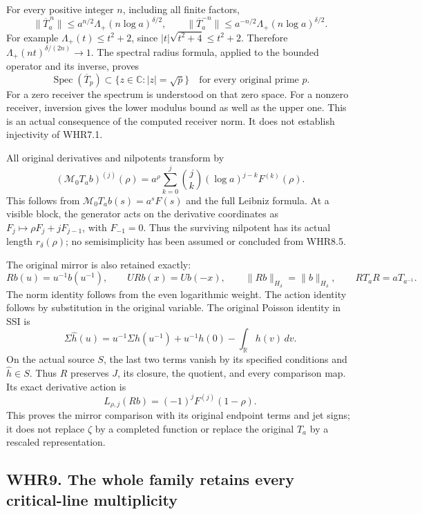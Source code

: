 For every positive integer \(n\), including all finite factors, \[
 \|\overline T_a^{\,n}\|
 \leq a^{n/2}\Lambda_+(n\log a)^{\delta/2},
 \qquad
 \|\overline T_a^{-n}\|
 \leq a^{-n/2}\Lambda_+(n\log a)^{\delta/2}.
 \tag{WHR8.4}
\] For example \(\Lambda_+(t)\leq t^2+2\), since
\(|t|\sqrt{t^2+4}\leq t^2+2\). Therefore
\(\Lambda_+(nt)^{\delta/(2n)}\to1\). The spectral radius formula,
applied to the bounded operator and its inverse, proves \[
 \boxed{\operatorname{Spec}(\overline T_p)
               \subset\{z\in\mathbb C:|z|=\sqrt p\}}
 \quad\text{for every original prime }p.
 \tag{WHR8.5}
\] For a zero receiver the spectrum is understood on that zero space.
For a nonzero receiver, inversion gives the lower modulus bound as well
as the upper one. This is an actual consequence of the computed receiver
norm. It does not establish injectivity of WHR7.1.

All original derivatives and nilpotents transform by \[
 (\mathcal M_0T_ab)^{(j)}(\rho)
 =a^\rho\sum_{k=0}^j\binom jk(\log a)^{j-k}F^{(k)}(\rho).
 \tag{WHR8.6}
\] This follows from \(\mathcal M_0T_ab(s)=a^sF(s)\) and the full
Leibniz formula. At a visible block, the generator acts on the
derivative coordinates as \(F_j\mapsto\rho F_j+jF_{j-1}\), with
\(F_{-1}=0\). Thus the surviving nilpotent has its actual length
\(r_\delta(\rho)\); no semisimplicity has been assumed or concluded from
WHR8.5.

The original mirror is also retained exactly: \[
 Rb(u)=u^{-1}b(u^{-1}),\qquad URb(x)=Ub(-x),\qquad
 \|Rb\|_{H_\delta}=\|b\|_{H_\delta},\qquad
 RT_aR=aT_{a^{-1}}.
 \tag{WHR8.7}
\] The norm identity follows from the even logarithmic weight. The
action identity follows by substitution in the original variable. The
original Poisson identity in SSI is \[
 \Sigma\widehat h(u)=u^{-1}\Sigma h(u^{-1})
               +u^{-1}h(0)-\int_{\mathbb R}h(v)\,dv.
\] On the actual source \(S\), the last two terms vanish by its
specified conditions and \(\widehat h\in S\). Thus \(R\) preserves
\(J\), its closure, the quotient, and every comparison map. Its exact
derivative action is \[
 L_{\rho,j}(Rb)=(-1)^jF^{(j)}(1-\rho).
 \tag{WHR8.8}
\] This proves the mirror comparison with its original endpoint terms
and jet signs; it does not replace \(\zeta\) by a completed function or
replace the original \(T_a\) by a rescaled representation.

\subsection{WHR9. The whole family retains every critical-line
multiplicity}\label{whr9.-the-whole-family-retains-every-critical-line-multiplicity}

